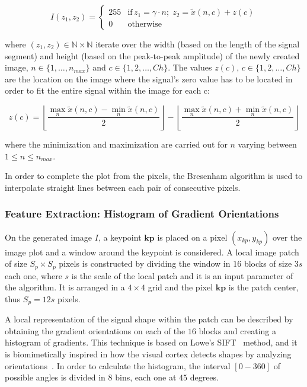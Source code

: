 \documentclass[utf8]{frontiersSCNS} %
\begin{document}
\begin{equation}
I(z_1,z_2) = \left\{ \begin{array}{rl}
255 & \text{if} \,  z_1 = \gamma \cdot n; \; z_2 = \tilde{x}(n,c) + z(c) \\
0   & \mbox{otherwise}
\end{array}\right.
\label{eq:images}
\end{equation}

\noindent where $ (z_1,z_2) \in \mathbb{N} \times \mathbb{N}$ iterate over the width (based on the length of the signal segment) and height (based on the peak-to-peak amplitude) of the newly created image,  $n \in \{1, \dots, n_{max}\}$ and $c \in \{1,2,\dots,Ch\}$.  The values $z(c)$, $c \in \{1,2,\dots,Ch\}$ are the location on the image where the signal's zero value has to be located in order to fit the entire signal within the image for each c:

\begin{equation}
z(c) = \left \lfloor{ \frac{\max_{n} \tilde{x}(n,c)  - \min_{n} \tilde{x}(n,c) }{2} }\right \rfloor -   \left \lfloor{ \frac{\max_{n} \tilde{x}(n,c)  + \min_{n} \tilde{x}(n,c)}{ 2} }\right \rfloor
\label{eq:zerolevel}
\end{equation}

\noindent where the minimization and maximization are carried out for $n$ varying between ${1 \leq n\leq n_{max}}$.
  
In order to complete the plot from the pixels, the Bresenham \citep{Bresenham1965,Ramele2016} algorithm is used to interpolate straight lines between each pair of  consecutive pixels.


\subsubsection{Feature Extraction: Histogram of Gradient Orientations}
\label{SIFT}


On the generated image $I$, a keypoint $\mathbf{kp}$ is placed on a pixel $(x_{kp}, y_{kp})$ over the image plot and a window around the keypoint is considered. A local image patch of size $S_p \times S_p$ pixels is constructed by dividing the window in $16$ blocks of size $3s$ each one,  where $s$ is the scale of the local patch and it is an input parameter of the algorithm. It is arranged in a $4 \times 4$ grid and the pixel $ \mathbf{kp}$ is the patch center, thus $S_p = 12s $ pixels. 

A local representation of the signal shape within the patch can be described by obtaining the gradient orientations on each of the $16$ blocks and creating a histogram of gradients.  This technique is based on Lowe's SIFT~\citep{Lowe2004} method, and it is biomimetically inspired in how the visual cortex detects shapes by analyzing orientations~\citep{cogprints561}.   In order to calculate the histogram, the interval $[0-360]$ of possible angles is divided in $8$ bins, each one at $45$ degrees.
\end{document}
